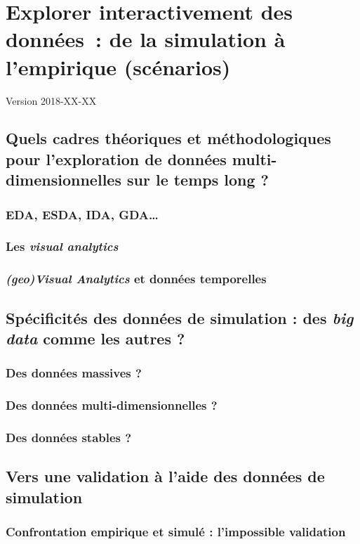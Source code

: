 \chapter{Explorer interactivement des données : de la simulation à l'empirique (scénarios)}
\begin{center}
	{\large Version 2018-XX-XX}
\end{center}
\minitoc

\section{Quels cadres théoriques et méthodologiques pour l'exploration de données multi-dimensionnelles sur le temps long ?}

\subsection{EDA, ESDA, IDA, GDA\dots}
\subsection{Les \textit{visual analytics}}
\subsection{\textit{(geo)Visual Analytics} et données temporelles}

\section{Spécificités des données de simulation : des \textit{big data} comme les autres ?}
\subsection{Des données massives ?}
\subsection{Des données multi-dimensionnelles ?}
\subsection{Des données stables ?}

\section{Vers une validation à l'aide des données de simulation}
\subsection{Confrontation empirique et simulé : l'impossible validation}
